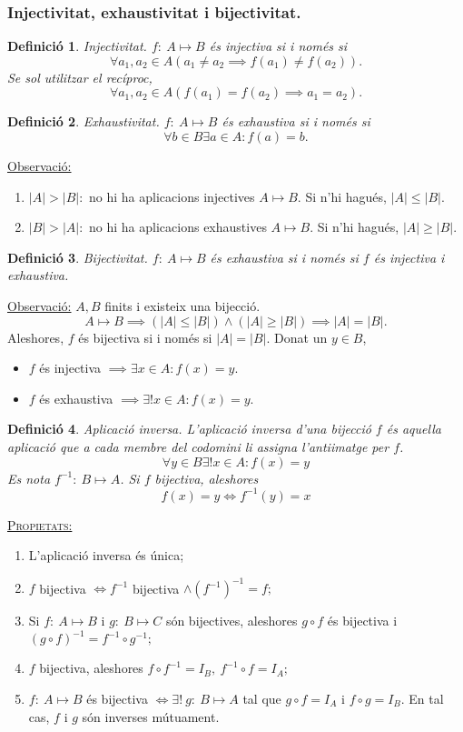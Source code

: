 \documentclass[11pt]{article}
\newcommand{\propietats}{\underline{{\scshape Propietats:}}}
\newcommand{\obs}{\underline{Observació:} }
\newtheorem{defi}{Definició}[section]
\begin{document}
\subsubsection{Injectivitat, exhaustivitat i bijectivitat.}
\begin{defi}
Injectivitat. $f: \ A\mapsto B$ és injectiva si i només si
$$\forall a_1,a_2\in A(a_1\neq a_2\implies f(a_1)\neq f(a_2)).$$
Se sol utilitzar el recíproc,
$$\forall a_1,a_2\in A(f(a_1)=f(a_2)\implies a_1=a_2).$$
\end{defi}
\begin{defi}
Exhaustivitat. $f: \ A\mapsto B$ és exhaustiva si i només si
$$\forall b\in B\exists a\in A:f(a)=b.$$
\end{defi}
\noindent\obs
\begin{enumerate}
\item $|A|>|B|:$ no hi ha aplicacions injectives $A\mapsto B$. Si n'hi hagués, $|A|\leq|B|$.
\item $|B|>|A|:$ no hi ha aplicacions exhaustives $A\mapsto B$. Si n'hi hagués, $|A|\geq|B|$.
\end{enumerate}
\begin{defi}
Bijectivitat.  $f: \ A\mapsto B$ és exhaustiva si i només si $f$ és injectiva i exhaustiva.
\end{defi}
\noindent\obs $A,B$ finits i existeix una bijecció.
$$A\mapsto B\implies (|A|\leq|B|)\wedge (|A|\geq|B|)\implies |A|=|B|.$$
Aleshores, $f$ és bijectiva si i només si $|A|=|B|$. Donat un $y\in B$,
\begin{itemize}
\item $f$ és injectiva $\implies\exists x\in A:f(x)=y.$
\item $f$ és exhaustiva $\implies\exists!x\in A:f(x)=y.$
\end{itemize}
\begin{defi}
Aplicació inversa. L'aplicació inversa d'una bijecció $f$ és aquella aplicació que a cada membre del codomini li assigna l'antiimatge per $f$.
$$\forall y\in B\exists!x\in A:f(x)=y$$
Es nota $f^{-1}: \ B\mapsto A$. Si $f$ bijectiva, aleshores
$$f(x)=y\iff f^{-1}(y)=x$$
\end{defi}
\noindent\propietats
\begin{enumerate}
	\item L'aplicació inversa és única;
	\item $f$ bijectiva $\iff f^{-1}$ bijectiva $\wedge (f^{-1})^{-1}=f;$
	\item Si $f:\ A\mapsto B$ i $g:\ B\mapsto C$ són bijectives, aleshores $g\circ f$ és bijectiva i $(g\circ f)^{-1}=f^{-1}\circ g^{-1};$
	\item $f$ bijectiva, aleshores $f\circ f^{-1}=I_B,\ f^{-1}\circ f=I_A;$
	\item $f:\ A\mapsto B$ és bijectiva $\iff\exists!\ g:\ B\mapsto A$ tal que $g\circ f=I_A$ i $f\circ g=I_B$. En tal cas, $f$ i $g$ són inverses mútuament.
\end{enumerate}
\end{document}
